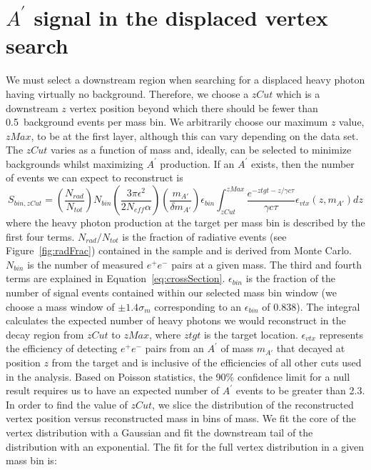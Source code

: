 \section{$A^{\prime}$ signal in the displaced vertex search}
We must select a downstream region when searching for a displaced heavy photon having virtually no background. Therefore, we choose a $zCut$ which is a downstream $z$ vertex position beyond which there should be fewer than 0.5~background events per mass bin. We arbitrarily choose our maximum $z$ value, $zMax$, to be at the first layer, although this can vary depending on the data set. The $zCut$ varies as a function of mass and, ideally, can be selected to minimize backgrounds whilst maximizing $A^{\prime}$ production. If an $A^{\prime}$ exists, then the number of events we can expect to reconstruct is 
\begin{equation}
\label{eq:signal}
S_{bin,zCut} = \left( \dfrac{N_{rad}}{N_{tot}}\right) N_{bin}\left(\dfrac{3\pi\epsilon^{2}}{2N_{eff}\alpha}\right)\left(\dfrac{m_{A'}}{\delta m_{A'}}\right)\epsilon_{bin}\int_{zCut}^{zMax}\dfrac{e^{-ztgt-z/\gamma c\tau}}{\gamma c \tau}\epsilon_{vtx}(z,m_{A'})dz
\end{equation}
where the heavy photon production at the target per mass bin is described by the first four terms.  $N_{rad}/N_{tot}$ is the fraction of radiative events (see Figure~\ref{fig:radFrac}) contained in the sample and is derived from Monte Carlo. $N_{bin}$ is the number of measured $e^+e^-$ pairs at a given mass. The third and fourth terms are explained in Equation~\eqref{eq:crossSection}. $\epsilon_{bin}$ is the fraction of the number of signal events contained within our selected mass bin window (we choose a mass window of $\pm1.4\sigma_m$ corresponding to an $\epsilon_{bin}$ of 0.838). The integral calculates the expected number of heavy photons we would reconstruct in the decay region from $zCut$ to $zMax$, where $ztgt$ is the target location. $\epsilon_{vtx}$ represents the efficiency of detecting $e^+e^-$ pairs from an $A^{\prime}$ of mass $m_{A'}$ that decayed at position $z$ from the target and is inclusive of the efficiencies of all other cuts used in the analysis. Based on Poisson statistics, the 90$\%$ confidence limit for a null result requires us to have an expected number of $A^{\prime}$ events to be greater than 2.3.\\
\indent In order to find the value of $zCut$, we slice the distribution of the reconstructed vertex position versus reconstructed mass in bins of mass. We fit the core of the vertex distribution with a Gaussian and fit the downstream tail of the distribution with an exponential. The fit for the full vertex distribution in a given mass bin is:
